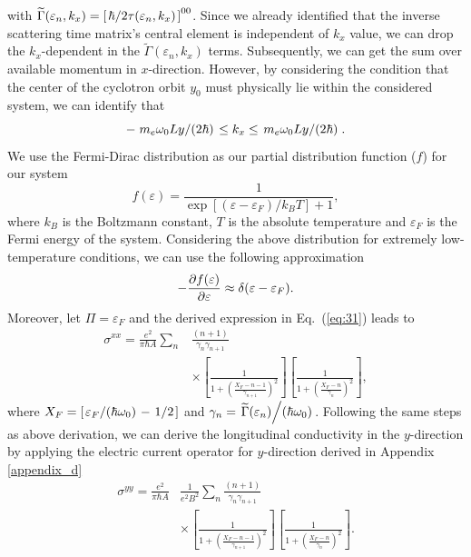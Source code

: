 \documentclass[
 reprint,
 amsmath,amssymb,
 aps,
 prb,
]{revtex4-2}
\begin{document}
with $\widetilde{{\Gamma}}(\varepsilon_n,k_x) = \left[\flatfrac{\hbar}{2\tau(\varepsilon_n,k_x)}\right]^{00}$. Since we already identified that the inverse scattering time matrix's central element is independent of $k_x$ value, we can drop the $k_x$-dependent in the $\widetilde{{\Gamma}}(\varepsilon_n,k_x)$ terms. Subsequently, we can get the sum over available momentum in $x$-direction.
However, by considering the condition that the center of the cyclotron orbit $y_0$ must physically lie within the considered system, we can identify that
\begin{equation} \label{eq:32}
 -\flatfrac{m_e\omega_0 Ly}{(2\hbar)} \leq k_x \leq \flatfrac{m_e\omega_0 Ly}{(2\hbar)}.
\end{equation}
We use the Fermi-Dirac distribution as our partial distribution function ($f$) for our system
\begin{equation} \label{eq:33}
  f(\varepsilon) = \frac{1}{\exp[(\varepsilon - \varepsilon_F)/k_B T]+1},
\end{equation}
where $k_B$ is the Boltzmann constant, $T$ is the absolute temperature and $\varepsilon_F$ is the Fermi energy of the system. Considering the above distribution for extremely low-temperature conditions, we can use the following approximation
\begin{equation} \label{eq:34}
  - \pdv{f(\varepsilon)}{\varepsilon} \approx \delta(\varepsilon - \varepsilon_F).
\end{equation}
Moreover, let $\Pi = \varepsilon_F$ and the derived expression in Eq.~(\ref{eq:31}) leads to
\begin{equation} \label{eq:35}
  \begin{aligned}
    \sigma^{xx}  =
    \frac{e^2}{\pi\hbar A}
    \sum_{n} &
    \frac{(n+1)}{\gamma_{n}\gamma_{n+1}} \\
    &\times
    \left[
      \frac{1}
      {
        1 + \left(\frac{X_F - n -1}{\gamma_{n+1}}\right)^2
      }
    \right]
    \left[
      \frac{1}
      {
        1 + \left(\frac{X_F - n}{\gamma_{n}}\right)^2
      }
    \right],
  \end{aligned}
\end{equation}
where $X_F = \left[\flatfrac{\varepsilon_F}{(\hbar \omega_0)} - \flatfrac{1}{2}\right]$
and
$\gamma_n = \flatfrac{\widetilde{{\Gamma}}(\varepsilon_n)}{(\hbar \omega_0)}$.
Following the same steps as above derivation, we can derive the longitudinal conductivity in the $y$-direction by applying the electric current operator for $y$-direction derived in Appendix \ref{appendix_d}
\begin{equation} \label{eq:36}
  \begin{aligned}
    {\sigma}^{yy} =
    \frac{e^2}{\pi\hbar A} &
    \frac{1}{e^2B^2}
    \sum_{n}
    \frac{(n+1)}{\gamma_{n}\gamma_{n+1}} \\
    & \times
    \left[
      \frac{1}
      {
        1 + \left(\frac{X_F - n -1}{\gamma_{n+1}}\right)^2
      }
    \right]
    \left[
      \frac{1}
      {
        1 + \left(\frac{X_F - n}{\gamma_{n}}\right)^2
      }
    \right].
  \end{aligned}
\end{equation}
\end{document}
